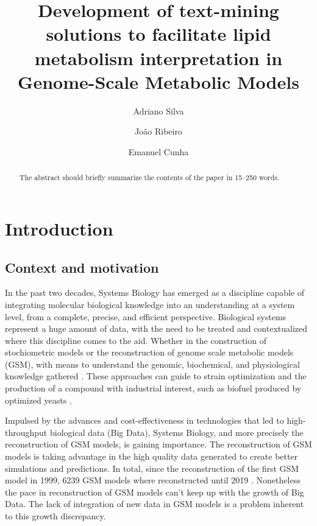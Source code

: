 \documentclass{llncs}
\begin{document}
\pagestyle{myheadings}
\title{Development of text-mining solutions to facilitate lipid metabolism interpretation in Genome-Scale Metabolic Models}

\author{Adriano Silva\and
João Ribeiro\and
Emanuel Cunha}

%
\maketitle              %
%
\begin{abstract}
The abstract should briefly summarize the contents of the paper in
15--250 words.

\end{abstract}
%
%
%
\section{Introduction}
\subsection{Context and motivation}
In the past two decades, Systems Biology has emerged as a discipline capable of integrating molecular biological knowledge into an understanding at a system level, from a complete, precise, and efficient perspective.
Biological systems represent a huge amount of data, with the need to be treated and contextualized where this discipline comes to the aid.  
Whether in the construction of stochiometric models or the reconstruction of genome scale metabolic models (GSM), with means to understand the genomic, biochemical, and physiological knowledge gathered \cite{Zou2018,Tavassoly2018}. 
These approaches can guide to strain optimization and the production of a compound with industrial interest, such as biofuel produced by optimized yeasts \cite{Aung2013}.

Impulsed by the advances and cost-effectiveness in technologies that led to high-throughput biological data (Big Data), Systems Biology, and more precisely the reconstruction of GSM models, is gaining importance.
The reconstruction of GSM models is taking advantage in the high quality data generated to create better simulations and predictions. 
In total, since the reconstruction of the first GSM model in 1999, 6239 GSM models where reconstructed until 2019 \cite{Gu2019}. 
Nonetheless the pace in reconstruction of GSM models can't keep up with the growth of Big Data. The lack of integration of new data in GSM models is a problem inherent to this growth discrepancy.
\end{document}
